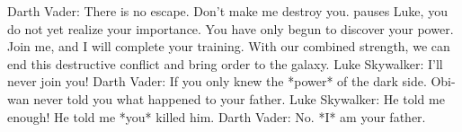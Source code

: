 Darth Vader:
	There is no escape. Don't make me destroy you.
	pauses Luke, you do not yet realize your importance.
	You have only begun to discover your power. Join me,
	and I will complete your training. With our combined
	strength, we can end this destructive conflict and
	bring order to the galaxy.
Luke Skywalker:
	I'll never join you!
Darth Vader:
	If you only knew the *power* of the dark side. Obi-wan
	never told you what happened to your father.
Luke Skywalker:
	He told me enough! He told me *you* killed him.
Darth Vader:
	No. *I* am your father.













